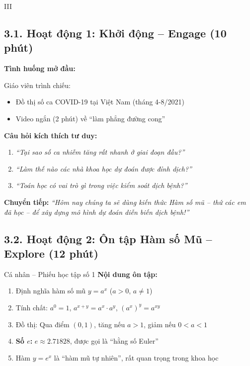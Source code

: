 \documentclass[12pt,a4paper]{article}
\begin{document}
\begin{competitionsection}{III}
\vspace{0.5cm}

\subsection*{3.1. Hoạt động 1: Khởi động -- Engage (10 phút)}

\begin{problembox}
\textbf{Tình huống mở đầu:}

Giáo viên trình chiếu:
\begin{itemize}
\item Đồ thị số ca COVID-19 tại Việt Nam (tháng 4-8/2021)
\item Video ngắn (2 phút) về ``làm phẳng đường cong''
\end{itemize}

\textbf{Câu hỏi kích thích tư duy:}
\begin{enumerate}
\item \textit{``Tại sao số ca nhiễm tăng rất nhanh ở giai đoạn đầu?''}
\item \textit{``Làm thế nào các nhà khoa học dự đoán được đỉnh dịch?''}
\item \textit{``Toán học có vai trò gì trong việc kiểm soát dịch bệnh?''}
\end{enumerate}

\textbf{Chuyển tiếp:} \textit{``Hôm nay chúng ta sẽ dùng kiến thức Hàm số mũ -- thứ các em đã học -- để xây dựng mô hình dự đoán diễn biến dịch bệnh!''}
\end{problembox}

\subsection*{3.2. Hoạt động 2: Ôn tập Hàm số Mũ -- Explore (12 phút)}

\begin{taskbox}{Cá nhân -- Phiếu học tập số 1}
\textbf{Nội dung ôn tập:}
\begin{enumerate}
\item Định nghĩa hàm số mũ $y = a^x$ ($a > 0$, $a \neq 1$)
\item Tính chất: $a^0 = 1$, $a^{x+y} = a^x \cdot a^y$, $(a^x)^y = a^{xy}$
\item Đồ thị: Qua điểm $(0, 1)$, tăng nếu $a > 1$, giảm nếu $0 < a < 1$
\item \textbf{Số $e$:} $e \approx 2.71828$, được gọi là ``hằng số Euler''
\item Hàm $y = e^x$ là ``hàm mũ tự nhiên'', rất quan trọng trong khoa học
\end{enumerate}


\end{taskbox}
\end{competitionsection}
\end{document}
